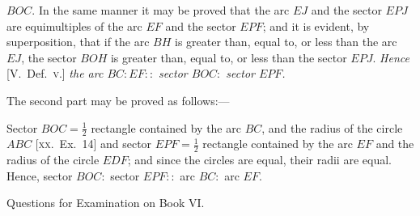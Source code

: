 \documentclass[oneside]{book}
\newcommand\exhead[1]{
\Needspace*{5\baselineskip}\begin{center}
\textsf{#1}
\end{center}
}
\begin{document}
$BOC$. In the same manner it may be proved that the
arc $EJ$ and the sector $EPJ$ are equimultiples of the
arc $EF$ and the sector $EPF$; and it is evident, by
superposition, that if the arc $BH$ is greater than, equal
to, or less than the arc $EJ$, the sector $BOH$ is greater
than, equal to, or less than the sector $EPJ$. \textit{Hence}
[V.\ Def.~\textsc{v}.] \textit{the arc $BC : EF ::$ sector $BOC :$ sector
$EPF$.}

\smallskip
The second part may be proved as follows:---

\begin{footnotesize}
Sector $BOC = \tfrac{1}{2}$ rectangle contained by the arc $BC$, and the
radius of the circle $ABC$ [\textsc{xx.}\ Ex.~14] and sector $EPF = \tfrac{1}{2}$ rectangle
contained by the arc $EF$ and the radius of the circle $EDF$;
and since the circles are equal, their radii are equal. Hence,
sector $BOC :$ sector $EPF ::$ arc $BC :$ arc $EF$.
\par\end{footnotesize}

\exhead{Questions for Examination on Book VI\@.}
\end{document}

